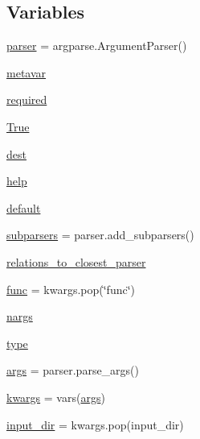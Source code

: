 \subsection*{Variables}
\begin{DoxyCompactItemize}
\item 
\hyperlink{namespacetask6_1_1anafora_1_1heuristic_ab794a5fa386cc3899781c999e0ffbe84}{parser} = argparse.\+Argument\+Parser()
\item 
\hyperlink{namespacetask6_1_1anafora_1_1heuristic_a76bb4fa398b2b4a09ea1f3dbef15578c}{metavar}
\item 
\hyperlink{namespacetask6_1_1anafora_1_1heuristic_a819a73aa552153c122f935c2425dda6e}{required}
\item 
\hyperlink{namespacetask6_1_1anafora_1_1heuristic_abbb4ab68f434fd71ac56434f6c9e0605}{True}
\item 
\hyperlink{namespacetask6_1_1anafora_1_1heuristic_a381bbe904bbbaafb97b55654fd27db40}{dest}
\item 
\hyperlink{namespacetask6_1_1anafora_1_1heuristic_aa0cf3a813f96b0ad54c3c83901af00b0}{help}
\item 
\hyperlink{namespacetask6_1_1anafora_1_1heuristic_a562208344b3e47eaf9d95b2f434ef92e}{default}
\item 
\hyperlink{namespacetask6_1_1anafora_1_1heuristic_a0cfc2949aae6bff43d53d7424d710429}{subparsers} = parser.\+add\+\_\+subparsers()
\item 
\hyperlink{namespacetask6_1_1anafora_1_1heuristic_a594ea27232287e567728da800879b6a6}{relations\+\_\+to\+\_\+closest\+\_\+parser}
\item 
\hyperlink{namespacetask6_1_1anafora_1_1heuristic_a552edc6c57827ad01dc415fac018076d}{func} = kwargs.\+pop(\char`\"{}func\char`\"{})
\item 
\hyperlink{namespacetask6_1_1anafora_1_1heuristic_a60e1cbafff2f75d68c99e49b02981064}{nargs}
\item 
\hyperlink{namespacetask6_1_1anafora_1_1heuristic_a34e63c2ca24090832c4322efea4cd132}{type}
\item 
\hyperlink{namespacetask6_1_1anafora_1_1heuristic_a8b29eeab29d66e234877fd19b8402e2e}{args} = parser.\+parse\+\_\+args()
\item 
\hyperlink{namespacetask6_1_1anafora_1_1heuristic_a394d316fdd41d938d2bb8f12d922706e}{kwargs} = vars(\hyperlink{namespacetask6_1_1anafora_1_1heuristic_a8b29eeab29d66e234877fd19b8402e2e}{args})
\item 
\hyperlink{namespacetask6_1_1anafora_1_1heuristic_a035f8d80cd7a366418422da543c3e2ff}{input\+\_\+dir} = kwargs.\+pop(\textquotesingle{}input\+\_\+dir\textquotesingle{})

\end{DoxyCompactItemize}
